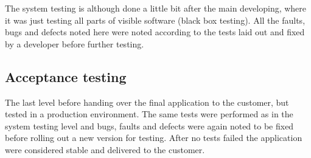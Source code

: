 The system testing is although done a little bit after the main developing, where it was just testing all parts of visible software (black box testing). All the faults, bugs and defects noted here were noted according to the tests laid out and fixed by a developer before further testing.
\subsection{Acceptance testing}
The last level before handing over the final application to the customer, but tested in a production environment. The same tests were performed as in the system testing level and bugs, faults and defects were again noted to be fixed before rolling out a new version for testing. After no tests failed the application were considered stable and delivered to the customer.




